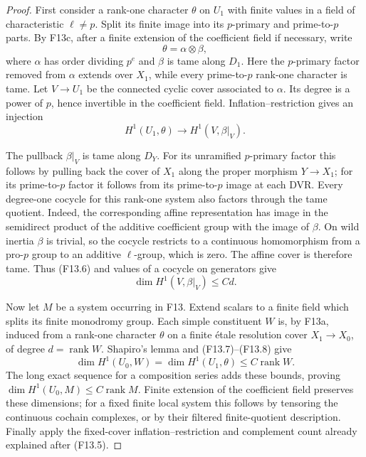 \begin{proof}
First consider a rank-one character $\theta$ on $U_1$ with finite
values in a field of characteristic $\ell\ne p$. Split its finite
image into its $p$-primary and prime-to-$p$ parts. By F13c, after
a finite extension of the coefficient field if necessary, write
\[
                         \theta=\alpha\otimes\beta,
\]
where $\alpha$ has order dividing $p^e$ and $\beta$ is tame
along $D_1$. Here the $p$-primary factor removed from $\alpha$
extends over $X_1$, while every prime-to-$p$ rank-one character
is tame. Let $V\to U_1$ be the connected cyclic cover associated
to $\alpha$. Its degree is a power of $p$, hence invertible in
the coefficient field. Inflation--restriction gives an injection
\[
                H^1(U_1,\theta)\longrightarrow H^1(V,\beta|_V).
 \tag{F13.7}
\]

The pullback $\beta|_V$ is tame along $D_Y$. For its unramified
$p$-primary factor this follows by pulling back the cover of
$X_1$ along the proper morphism $Y\to X_1$; for its prime-to-$p$
factor it follows from its prime-to-$p$ image at each DVR.
Every degree-one cocycle for this rank-one system also factors
through the tame quotient. Indeed, the corresponding affine
representation has image in the semidirect product of the additive
coefficient group with the image of $\beta$. On wild inertia
$\beta$ is trivial, so the cocycle restricts to a continuous
homomorphism from a pro-$p$ group to an additive $\ell$-group,
which is zero. The affine cover is therefore tame. Thus (F13.6)
and values of a cocycle on generators give
\[
          \dim H^1(V,\beta|_V)\leq Cd.
 \tag{F13.8}
\]

Now let $M$ be a system occurring in F13. Extend scalars to a
finite field which splits its finite monodromy group. Each simple
constituent $W$ is, by F13a, induced from a rank-one character
$\theta$ on a finite \'etale resolution cover $X_1\to X_0$,
of degree $d=\operatorname{rank}W$. Shapiro's lemma and
(F13.7)--(F13.8) give
\[
 \dim H^1(U_0,W)=\dim H^1(U_1,\theta)
                   \leq C\operatorname{rank}W.
\]
The long exact sequence for a composition series adds these
bounds, proving $\dim H^1(U_0,M)\leq C\operatorname{rank}M$.
Finite extension of the coefficient field preserves these
dimensions; for a fixed finite local system this follows by
tensoring the continuous cochain complexes, or by their filtered
finite-quotient description. Finally apply the fixed-cover
inflation--restriction and complement count already explained
after (F13.5).
\end{proof}

